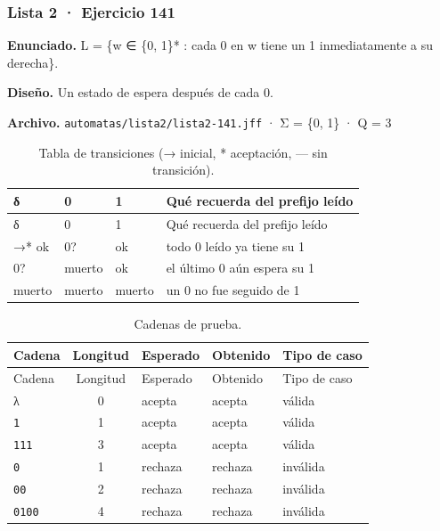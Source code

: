 
\hypertarget{lista-2-ejercicio-141}{%
\subsubsection{Lista 2 · Ejercicio 141}\label{lista-2-ejercicio-141}}

\textbf{Enunciado.} L = \{w ∈ \{0, 1\}* : cada 0 en w tiene un 1 inmediatamente a su derecha\}.

\textbf{Diseño.} Un estado de espera después de cada 0.

\textbf{Archivo.} \texttt{automatas/lista2/lista2-141.jff} · Σ = \{0, 1\} · \textbar Q\textbar{} = 3

\begin{longtable}[]{@{}llll@{}}
\caption{Tabla de transiciones (→ inicial, * aceptación, --- sin transición).}\tabularnewline
\toprule\noalign{}
δ & 0 & 1 & Qué recuerda del prefijo leído \\
\midrule\noalign{}
\endfirsthead
\toprule\noalign{}
δ & 0 & 1 & Qué recuerda del prefijo leído \\
\midrule\noalign{}
\endhead
\bottomrule\noalign{}
\endlastfoot
→* ok & 0? & ok & todo 0 leído ya tiene su 1 \\
0? & muerto & ok & el último 0 aún espera su 1 \\
muerto & muerto & muerto & un 0 no fue seguido de 1 \\
\end{longtable}

\begin{longtable}[]{@{}lclll@{}}
\caption{Cadenas de prueba.}\tabularnewline
\toprule\noalign{}
Cadena & Longitud & Esperado & Obtenido & Tipo de caso \\
\midrule\noalign{}
\endfirsthead
\toprule\noalign{}
Cadena & Longitud & Esperado & Obtenido & Tipo de caso \\
\midrule\noalign{}
\endhead
\bottomrule\noalign{}
\endlastfoot
λ & 0 & acepta & acepta & válida \\
\texttt{1} & 1 & acepta & acepta & válida \\
\texttt{111} & 3 & acepta & acepta & válida \\
\texttt{0} & 1 & rechaza & rechaza & inválida \\
\texttt{00} & 2 & rechaza & rechaza & inválida \\
\texttt{0100} & 4 & rechaza & rechaza & inválida \\
\end{longtable}

